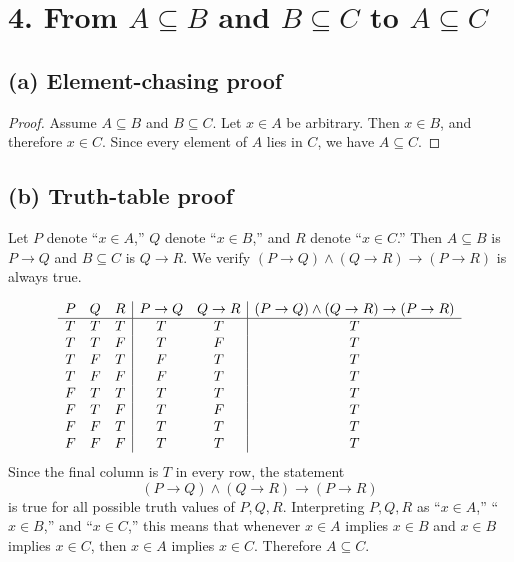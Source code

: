 \section*{4. From $A\subseteq B$ and $B\subseteq C$ to $A\subseteq C$}

\subsection*{(a) Element-chasing proof}
\begin{proof}
Assume $A\subseteq B$ and $B\subseteq C$. Let $x\in A$ be arbitrary.
Then $x\in B$, and therefore $x\in C$. Since every element of $A$ lies in $C$,
we have $A\subseteq C$.
\end{proof}

\subsection*{(b) Truth-table proof}
Let $P$ denote “$x\in A$,” $Q$ denote “$x\in B$,” and $R$ denote “$x\in C$.”
Then $A\subseteq B$ is $P\to Q$ and $B\subseteq C$ is $Q\to R$.
We verify $(P\to Q)\land(Q\to R)\to(P\to R)$ is always true.

\[
\begin{array}{c c c|c c|c}
P & Q & R & P\to Q & Q\to R & (P\to Q)\land(Q\to R)\to(P\to R)\\ \hline
T & T & T & T & T & T\\
T & T & F & T & F & T\\
T & F & T & F & T & T\\
T & F & F & F & T & T\\
F & T & T & T & T & T\\
F & T & F & T & F & T\\
F & F & T & T & T & T\\
F & F & F & T & T & T
\end{array}
\]
Since the final column is $T$ in every row, the statement
\[
(P\to Q)\land(Q\to R)\to(P\to R)
\]
is true for all possible truth values of $P,Q,R$. Interpreting
$P,Q,R$ as “$x\in A$,” “$x\in B$,” and “$x\in C$,” this means that
whenever $x\in A$ implies $x\in B$ and $x\in B$ implies $x\in C$,
then $x\in A$ implies $x\in C$. Therefore $A\subseteq C$.
